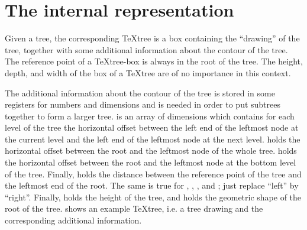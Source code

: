                                                                               
\section{The internal representation}                                           
                                                                                
Given a tree, the corresponding \TeX{}tree is a box containing                  
the ``drawing'' of the tree, together with some additional                      
information about the contour of the tree.                                                              
The reference point of a \TeX{}tree-box is always in the root of the            
tree. The height, depth, and width of the box of a \TeX{}tree are               
of no importance in this context.                                               
                                                                                
The additional information about the contour of the tree is stored in some      
registers for numbers and dimensions and                                        
is needed in order to put subtrees together to form a larger tree.              
 is an array of dimensions which contains for each                    
level of the tree the horizontal offset between the                             
left end of the                                                                 
leftmost node at the current level and the                                      
left end of the leftmost node at                                                
the next level.                                                                 
 holds the horizontal offset between the root                        
and the leftmost node of the whole tree.  holds the                  
horizontal offset between the root and the leftmost node at                     
the bottom level of the tree.                                                   
Finally,  holds the distance between the reference point              
of the tree and the leftmost end of the root.                                   
The same is true for                                                            
, , , and ; just replace              
``left'' by ``right''. Finally,                                                 
 holds the height of the tree, and  holds the             
geometric shape of the root of the tree.  shows an example \TeX{}tree,
i.e. a tree drawing and the corresponding additional information.


